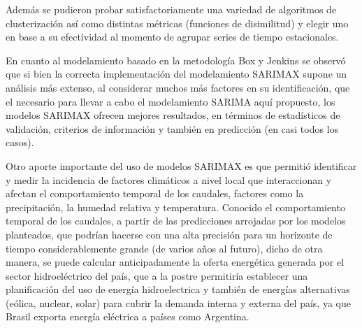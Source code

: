 \documentclass[12pt,oneside]{book}\usepackage[]{graphicx}\usepackage[]{color}
\theoremstyle{definition} %
\begin{document}


Además se pudieron probar satisfactoriamente una variedad de algoritmos de clusterización así como distintas métricas (funciones de disimilitud) y elegir uno en base a su efectividad al momento de agrupar series de tiempo estacionales.




En cuanto al modelamiento basado en la metodología Box y Jenkins se observó que si bien la correcta implementación del modelamiento SARIMAX supone un análisis más extenso, al considerar muchos más factores en su identificación, que el necesario para llevar a cabo el modelamiento SARIMA aquí propuesto, los modelos SARIMAX ofrecen mejores resultados, en términos de estadísticos de validación, criterios de información y también en predicción (en casi todos los casos). 





Otro aporte importante del uso de modelos SARIMAX es que permitió identificar y medir la incidencia de factores climáticos a nivel local que interaccionan y afectan el comportamiento temporal de los caudales, factores como la precipitación, la humedad relativa y temperatura.
Conocido el comportamiento temporal de los caudales, a partir de las predicciones arrojadas por los modelos planteados, que podrían hacerse con una alta precisión para un horizonte de tiempo considerablemente grande (de varios años al futuro), dicho de otra manera, se puede calcular anticipadamente la oferta energética generada por el sector hidroeléctrico del país, que a la postre permitiría establecer una planificación del uso de energía hidroelectrica y también de energías alternativas (eólica, nuclear, solar) para cubrir la demanda interna y externa del país, ya que Brasil exporta energía eléctrica a países como Argentina.
\end{document}
